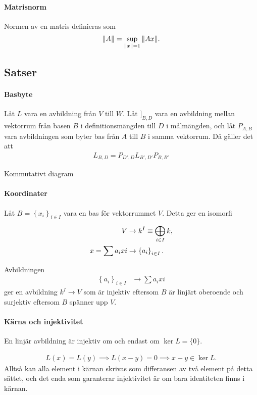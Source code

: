 \paragraph{Matrisnorm}
Normen av en matris definieras som
\begin{align*}
	\norm{A} = \sup\limits_{\norm{x} = 1}\norm{Ax}.
\end{align*}

\subsection{Satser}

\paragraph{Basbyte}
Låt $L$ vara en avbildning från $V$ till $W$. Låt $]_{B, D}$ vara en avbildning mellan vektorrum från basen $B$ i definitionsmängden till $D$ i målmängden, och låt $P_{A, B}$ vara avbildningen som byter bas från $A$ till $B$ i samma vektorrum. Då gäller det att
\begin{align*}
	L_{B, D} = P_{D', D}L_{B', D'}P_{B, B'}
\end{align*}

\proof
Kommutativt diagram

\paragraph{Koordinater}
Låt $B = \left\{x_{i}\right\}_{i\in I}$ vara en bas för vektorrummet $V$. Detta ger en isomorfi
\begin{align*}
	V                  &\to k^{I}\equiv \bigoplus\limits_{i\in I}^{}k, \\
	x = \sum a_{i}x{i} &\to \left\{a_{i}\right\}_{i\in I}.
\end{align*}

\proof
Avbildningen
\begin{align*}
	\left\{a_{i}\right\}_{i\in I} &\to \sum a_{i}x{i}
\end{align*}
ger en avbildning $k^{I}\to V$ som är injektiv eftersom $B$ är linjärt oberoende och surjektiv eftersom $B$ spänner upp $V$.

\paragraph{Kärna och injektivitet}
En linjär avbildning är injektiv om och endast om $\ker{L} = \{0\}$.

\proof
\begin{align*}
	L(x) = L(y)\implies L(x - y) = 0\implies x - y\in\ker{L}.
\end{align*}
Alltså kan alla element i kärnan skrivas som differansen av två element på detta sättet, och det enda som garanterar injektivitet är om bara identiteten finns i kärnan.

